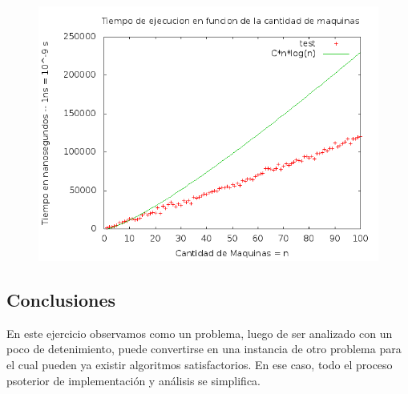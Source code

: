 \begin{figure}[H]
	\centering
	\includegraphics[scale=0.5]{ej1-Test1.png}
	\caption{ }
\end{figure}


\subsection{Conclusiones}
En este ejercicio observamos como un problema, luego de ser analizado con un poco de detenimiento, puede convertirse en una instancia de otro problema para el cual pueden ya existir algoritmos satisfactorios. En ese caso, todo el proceso psoterior de implementaci\'on y an\'alisis se simplifica.